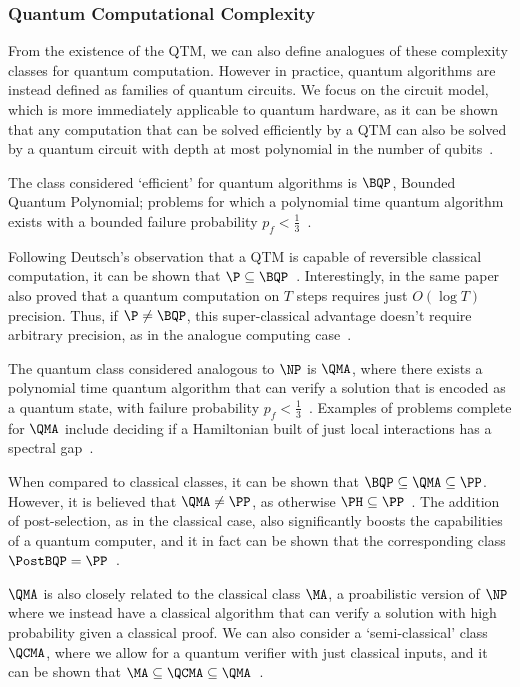 \subsubsection*{Quantum Computational Complexity}
From the existence of the QTM, we can also define analogues of these complexity classes for quantum computation. However in practice, quantum algorithms are instead defined as families of quantum circuits. We focus on the circuit model, which is more immediately applicable to quantum hardware, as it can be shown that any computation that can be solved efficiently by a QTM can also be solved by a quantum circuit with depth at most polynomial in the number of qubits~\cite{Yao1993}.\par 
The class considered `efficient' for quantum algorithms is $\BQP$, Bounded Quantum Polynomial; problems for which a polynomial time quantum algorithm exists with a bounded failure probability $p_{f}<\frac{1}{3}$~\cite{Nielsen2000}.
\par
Following Deutsch's observation that a QTM is capable of reversible classical computation, it can be shown that $\P\subseteq \BQP$~\cite{Bernstein1997}. Interestingly, in the same paper also proved that a quantum computation on $T$ steps requires just $O\left(\log{T}\right)$ precision. Thus, if $\P\neq \BQP$, this super-classical advantage doesn't require arbitrary precision, as in the analogue computing case~\cite{Bernstein1997}.\par
The quantum class considered analogous to $\NP$ is $\QMA$, where there exists a polynomial time quantum algorithm that can verify a solution that is encoded as a quantum state, with failure probability $p_{f}<\frac{1}{3}$~\cite{Watrous2008}. Examples of problems complete for $\QMA$ include deciding if a Hamiltonian built of just local interactions has a spectral gap~\cite{Kempe2004}.\par
When compared to classical classes, it can be shown that $\BQP\subseteq \QMA\subseteq \PP$. However, it is believed that $\QMA\neq \PP$, as otherwise $\PH\subseteq \PP$~\cite{Vyalyi03}. The addition of post-selection, as in the classical case, also significantly boosts the capabilities of a quantum computer, and it in fact can be shown that the corresponding class $\PostBQP=\PP$~\cite{Aaronson2004c}.\par
$\QMA$ is also closely related to the classical class $\MA$, a proabilistic version of $\NP$ where we instead have a classical algorithm that can verify a solution with high probability given a classical proof. We can also consider a `semi-classical' class $\QCMA$, where we allow for a quantum verifier with just classical inputs, and it can be shown that $\MA\subseteq \QCMA\subseteq \QMA$~\cite{Aharonov2002}.\par
